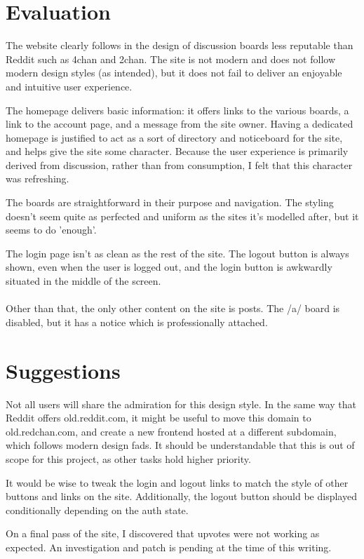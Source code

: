 \section{Evaluation}
The website clearly follows in the design of discussion boards less reputable than Reddit such as 4chan and 2chan. The site is not modern and does not follow modern design styles (as intended), but it does not fail to deliver an enjoyable and intuitive user experience.

The homepage delivers basic information: it offers links to the various boards, a link to the account page, and a message from the site owner. Having a dedicated homepage is justified to act as a sort of directory and noticeboard for the site, and helps give the site some character. Because the user experience is primarily derived from discussion, rather than from consumption, I felt that this character was refreshing.

The boards are straightforward in their purpose and navigation. The styling doesn't seem quite as perfected and uniform as the sites it's modelled after, but it seems to do 'enough'.

The login page isn't as clean as the rest of the site. The logout button is always shown, even when the user is logged out, and the login button is awkwardly situated in the middle of the screen.
\\\\
Other than that, the only other content on the site is posts. The /a/ board is disabled, but it has a notice which is professionally attached.

\section{Suggestions}
Not all users will share the admiration for this design style. In the same way that Reddit offers old.reddit.com, it might be useful to move this domain to old.redchan.com, and create a new frontend hosted at a different subdomain, which follows modern design fads. It should be understandable that this is out of scope for this project, as other tasks hold higher priority.

It would be wise to tweak the login and logout links to match the style of other buttons and links on the site. Additionally, the logout button should be displayed conditionally depending on the auth state.

On a final pass of the site, I discovered that upvotes were not working as expected. An investigation and patch is pending at the time of this writing.
